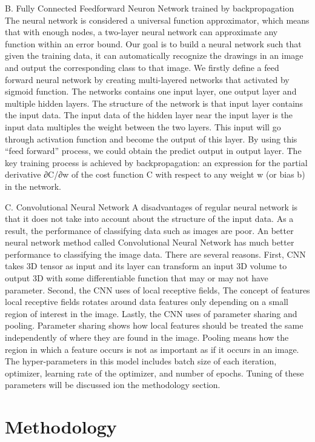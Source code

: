 \documentclass[conference]{IEEEtran}
\begin{document}
B. Fully Connected Feedforward Neuron Network  trained by backpropagation
The neural network is considered a universal function approximator, which means that with enough nodes, a two-layer neural network can approximate any function within an error bound. Our goal is to build a neural network such that given the training data, it can automatically recognize the drawings in an image and output the corresponding class to that image. 
We firstly define a feed forward neural network by creating multi-layered networks that activated  by sigmoid function. The networks contains one input layer, one output layer and multiple hidden layers. 
The structure of the network is that input layer contains the input data. The input data of the hidden layer near the input layer is the input data multiples the weight between the two layers. This input will go through activation function and become the output of this layer. By using this “feed forward” process, we could obtain the predict output in output layer.
The key training process is achieved by backpropagation:  an expression for the partial derivative ∂C/∂w of the cost function C with respect to any weight w (or bias b) in the network. 

C. Convolutional Neural Network  
A disadvantages of regular neural network is that it does not take into account about the structure of the input data. As a result, the performance of classifying data such as images are poor. 
An better neural network method called Convolutional Neural Network has much better performance to classifying the image data. There are several reasons.
First, CNN takes 3D tensor as input and its layer can transform an input 3D volume to output 3D with some differentiable function that may or may not have parameter. 
Second, the CNN uses of local receptive fields, The concept of features local receptive fields rotates around data features only depending on a small region of interest in the image. 
Lastly, the CNN uses of  parameter sharing and pooling. Parameter sharing shows how local features should be treated the same independently of where they are found in the image. Pooling means how the region in which a feature occurs is not as important as if it occurs in an image. 
The hyper-parameters in this model includes batch size of each iteration, optimizer, learning rate of the optimizer, and number of epochs. Tuning of these parameters will be discussed ion the methodology section.


\section{Methodology}
\end{document}
